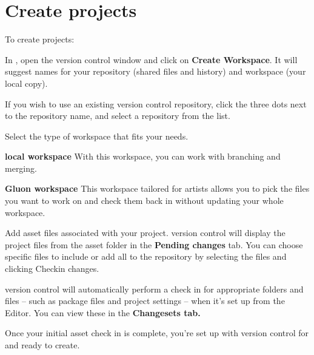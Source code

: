 \chapter{Create projects}
\hypertarget{md__hey_tea_9_2_library_2_package_cache_2com_8unity_8collab-proxy_0d2_80_85_2_documentation_0i_2_create_projects}{}\label{md__hey_tea_9_2_library_2_package_cache_2com_8unity_8collab-proxy_0d2_80_85_2_documentation_0i_2_create_projects}
\label{md__hey_tea_9_2_library_2_package_cache_2com_8unity_8collab-proxy_0d2_80_85_2_documentation_0i_2_create_projects_autotoc_md865}%
%
 To create projects\+:


\begin{DoxyEnumerate}
\item In , open the version control window and click on {\bfseries{Create Workspace}}. It will suggest names for your repository (shared files and history) and workspace (your local copy).
\end{DoxyEnumerate}

If you wish to use an existing version control repository, click the three dots next to the repository name, and select a repository from the list.


\begin{DoxyEnumerate}
\item Select the type of workspace that fits your needs.
\end{DoxyEnumerate}
\begin{DoxyItemize}
\item {\bfseries{local workspace}} With this workspace, you can work with branching and merging.
\item {\bfseries{Gluon workspace}} This workspace tailored for artists allows you to pick the files you want to work on and check them back in without updating your whole workspace.
\end{DoxyItemize}
\begin{DoxyEnumerate}
\item Add asset files associated with your project. version control will display the project files from the asset folder in the {\bfseries{Pending changes}} tab. You can choose specific files to include or add all to the repository by selecting the files and clicking Checkin changes.
\end{DoxyEnumerate}

version control will automatically perform a check in for appropriate folders and files – such as package files and project settings – when it’s set up from the  Editor. You can view these in the {\bfseries{Changesets tab.}}

Once your initial asset check in is complete, you’re set up with version control for  and ready to create. 